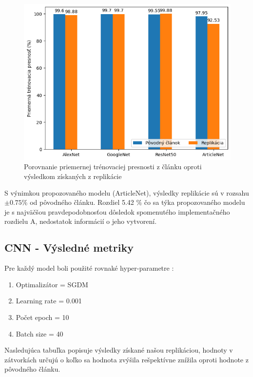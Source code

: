 \documentclass[journal,onecolumn]{IEEEtran}
\begin{document}
\begin{figure}[!htb]
    \centering
    \includegraphics[width=0.6\linewidth]{Images/c_vs_rep.png}
    \caption{Porovnanie priemernej trénovaciej presnosti z článku oproti výsledkom získaných z replikácie}
    \label{fig:enter-label}
\end{figure}

S výnimkou propozovaného modelu (ArticleNet), výsledky replikácie sú v rozsahu $\pm 0.75\%$ od pôvodného článku. Rozdiel 5.42 \% čo sa týka propozovaného modelu je s najväčšou pravdepodobnosťou dôsledok spomenutého implementačného rozdielu A, nedostatok informácií o jeho vytvorení.

\subsection{CNN - Výsledné metriky}

Pre každý model boli použité rovnaké hyper-parametre :
\begin{enumerate}
  \item Optimalizátor = SGDM
  \item Learning rate = 0.001
  \item Počet epoch = 10
  \item Batch size = 40
\end{enumerate}

\vspace{10pt}
Nasledujúca tabuľka popisuje výsledky získané našou replikáciou, hodnoty v zátvorkách určujú o koľko sa hodnota zvýšila rešpektívne znížila oproti hodnote z pôvodného článku.
\end{document}
